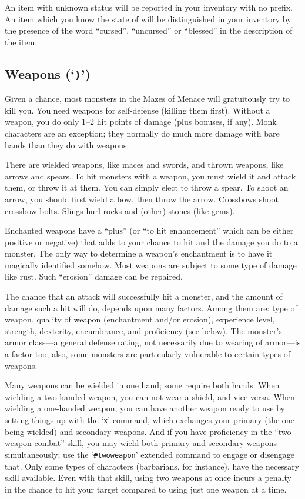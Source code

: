 An item with unknown status will be reported in your inventory with no prefix.
An item which you know the state of will be distinguished in your inventory
by the presence of the word ``cursed'', ``uncursed'' or ``blessed'' in the
description of the item.

\subsection*{Weapons (`{\tt )}')}

Given a chance, most monsters in the Mazes of Menace will gratuitously try to
kill you.  You need weapons for self-defense (killing them first).  Without a
weapon, you do only 1--2 hit points of damage (plus bonuses, if any).
Monk characters are an exception; they normally do much more damage with
bare hands than they do with weapons.

There are wielded weapons, like maces and swords, and thrown weapons,
like arrows and spears.  To hit monsters with a weapon, you must wield it and
attack them, or throw it at them.  You can simply elect to throw a spear.
To shoot an arrow, you should first wield a bow, then throw the arrow.
Crossbows shoot crossbow bolts.  Slings hurl rocks and (other) stones
(like gems).

Enchanted weapons have a ``plus'' (or ``to hit enhancement'' which can be
either positive or negative) that adds to your chance to
hit and the damage you do to a monster.  The only way to determine a weapon's
enchantment is to have it magically identified somehow.
Most weapons are subject to some type of damage like rust.  Such
``erosion'' damage can be repaired.

The chance that an attack will successfully hit a monster, and the amount
of damage such a hit will do, depends upon many factors.  Among them are:
type of weapon, quality of weapon (enchantment and/or erosion), experience
level, strength, dexterity, encumbrance, and proficiency (see below).  The
monster's armor class---a general defense rating, not necessarily due to
wearing of armor---is a factor too; also, some monsters are particularly
vulnerable to certain types of weapons.

Many weapons can be wielded in one hand; some require both hands.
When wielding a two-handed weapon, you can not wear a shield, and
vice versa.  When wielding a one-handed weapon, you can have another
weapon ready to use by setting things up with the `{\tt x}' command, which
exchanges your primary (the one being wielded) and secondary weapons.
And if you have proficiency in the ``two weapon combat'' skill, you
may wield both primary and secondary weapons simultaneously; use the
`{\tt \#twoweapon}' extended command to engage or disengage that.  Only
some types of characters (barbarians, for instance), have the necessary
skill available.  Even with that skill, using two weapons at once incurs
a penalty in the chance to hit your target compared to using just one
weapon at a time.

